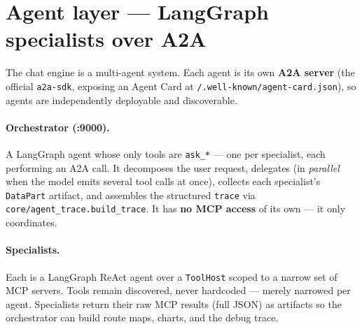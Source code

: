 \documentclass[11pt,a4paper]{article}
\newcommand{\code}[1]{{\small\texttt{#1}}}
\begin{document}
\section{Agent layer --- LangGraph specialists over A2A}
The chat engine is a multi-agent system. Each agent is its own \textbf{A2A server} (the
official \code{a2a-sdk}, exposing an Agent Card at \code{/.well-known/agent-card.json}), so
agents are independently deployable and discoverable.

\paragraph{Orchestrator (:9000).} A LangGraph agent whose only tools are \code{ask\_*} ---
one per specialist, each performing an A2A call. It decomposes the user request, delegates
(in \emph{parallel} when the model emits several tool calls at once), collects each
specialist's \code{DataPart} artifact, and assembles the structured \code{trace} via
\code{core/agent\_trace.build\_trace}. It has \textbf{no MCP access} of its own --- it only
coordinates.

\paragraph{Specialists.} Each is a LangGraph ReAct agent over a \code{ToolHost} scoped to a
narrow set of MCP servers. Tools remain discovered, never hardcoded --- merely narrowed per
agent. Specialists return their raw MCP results (full JSON) as artifacts so the orchestrator
can build route maps, charts, and the debug trace.
\end{document}
